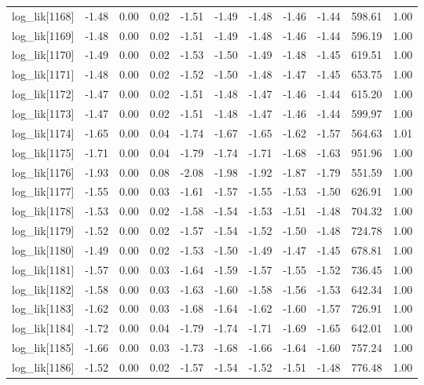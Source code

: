 \begin{table}[ht]
\begin{tabular}{rrrrrrrrrrr}
  log\_lik[1168] & -1.48 & 0.00 & 0.02 & -1.51 & -1.49 & -1.48 & -1.46 & -1.44 & 598.61 & 1.00 \\ 
  log\_lik[1169] & -1.48 & 0.00 & 0.02 & -1.51 & -1.49 & -1.48 & -1.46 & -1.44 & 596.19 & 1.00 \\ 
  log\_lik[1170] & -1.49 & 0.00 & 0.02 & -1.53 & -1.50 & -1.49 & -1.48 & -1.45 & 619.51 & 1.00 \\ 
  log\_lik[1171] & -1.48 & 0.00 & 0.02 & -1.52 & -1.50 & -1.48 & -1.47 & -1.45 & 653.75 & 1.00 \\ 
  log\_lik[1172] & -1.47 & 0.00 & 0.02 & -1.51 & -1.48 & -1.47 & -1.46 & -1.44 & 615.20 & 1.00 \\ 
  log\_lik[1173] & -1.47 & 0.00 & 0.02 & -1.51 & -1.48 & -1.47 & -1.46 & -1.44 & 599.97 & 1.00 \\ 
  log\_lik[1174] & -1.65 & 0.00 & 0.04 & -1.74 & -1.67 & -1.65 & -1.62 & -1.57 & 564.63 & 1.01 \\ 
  log\_lik[1175] & -1.71 & 0.00 & 0.04 & -1.79 & -1.74 & -1.71 & -1.68 & -1.63 & 951.96 & 1.00 \\ 
  log\_lik[1176] & -1.93 & 0.00 & 0.08 & -2.08 & -1.98 & -1.92 & -1.87 & -1.79 & 551.59 & 1.00 \\ 
  log\_lik[1177] & -1.55 & 0.00 & 0.03 & -1.61 & -1.57 & -1.55 & -1.53 & -1.50 & 626.91 & 1.00 \\ 
  log\_lik[1178] & -1.53 & 0.00 & 0.02 & -1.58 & -1.54 & -1.53 & -1.51 & -1.48 & 704.32 & 1.00 \\ 
  log\_lik[1179] & -1.52 & 0.00 & 0.02 & -1.57 & -1.54 & -1.52 & -1.50 & -1.48 & 724.78 & 1.00 \\ 
  log\_lik[1180] & -1.49 & 0.00 & 0.02 & -1.53 & -1.50 & -1.49 & -1.47 & -1.45 & 678.81 & 1.00 \\ 
  log\_lik[1181] & -1.57 & 0.00 & 0.03 & -1.64 & -1.59 & -1.57 & -1.55 & -1.52 & 736.45 & 1.00 \\ 
  log\_lik[1182] & -1.58 & 0.00 & 0.03 & -1.63 & -1.60 & -1.58 & -1.56 & -1.53 & 642.34 & 1.00 \\ 
  log\_lik[1183] & -1.62 & 0.00 & 0.03 & -1.68 & -1.64 & -1.62 & -1.60 & -1.57 & 726.91 & 1.00 \\ 
  log\_lik[1184] & -1.72 & 0.00 & 0.04 & -1.79 & -1.74 & -1.71 & -1.69 & -1.65 & 642.01 & 1.00 \\ 
  log\_lik[1185] & -1.66 & 0.00 & 0.03 & -1.73 & -1.68 & -1.66 & -1.64 & -1.60 & 757.24 & 1.00 \\ 
  log\_lik[1186] & -1.52 & 0.00 & 0.02 & -1.57 & -1.54 & -1.52 & -1.51 & -1.48 & 776.48 & 1.00 \\ 

\end{tabular}
\end{table}
